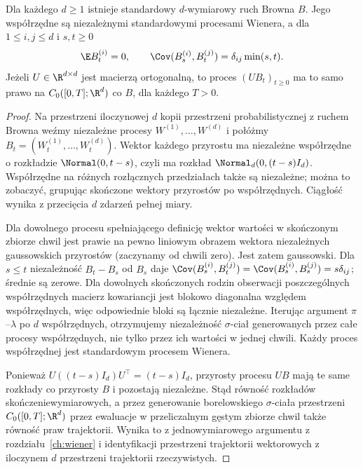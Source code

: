 \begin{twierdzenie}
Dla każdego $d\ge1$ istnieje standardowy $d$-wymiarowy ruch
Browna $B$. Jego współrzędne są niezależnymi standardowymi
procesami Wienera, a dla $1\le i,j\le d$ i $s,t\ge0$
\[
\E B_t^{(i)}=0,\qquad
\Cov(B_s^{(i)},B_t^{(j)})=\delta_{ij}\min(s,t).
\]
Jeżeli $U\in\R^{d\times d}$ jest macierzą ortogonalną,
to proces $(UB_t)_{t\ge0}$ ma to samo prawo na
$C_0([0,T];\R^d)$ co $B$, dla każdego $T>0$.
\end{twierdzenie}
\begin{proof}
Na przestrzeni iloczynowej $d$ kopii przestrzeni probabilistycznej
z ruchem Browna weźmy niezależne procesy $W^{(1)},\ldots,W^{(d)}$
i połóżmy $B_t=(W_t^{(1)},\ldots,W_t^{(d)})$.
Wektor każdego przyrostu ma niezależne współrzędne o rozkładzie
$\Normal(0,t-s)$, czyli ma rozkład $\Normal_d(0,(t-s)I_d)$.
Współrzędne na różnych rozłącznych przedziałach także są niezależne;
można to zobaczyć, grupując skończone wektory przyrostów po
współrzędnych. Ciągłość wynika z przecięcia $d$ zdarzeń pełnej miary.

Dla dowolnego procesu spełniającego definicję wektor
wartości w skończonym zbiorze chwil jest prawie na pewno
liniowym obrazem wektora niezależnych gaussowskich przyrostów
(zaczynamy od chwili zero). Jest zatem gaussowski.
Dla $s\le t$ niezależność $B_t-B_s$ od $B_s$ daje
$\Cov(B_s^{(i)},B_t^{(j)})=\Cov(B_s^{(i)},B_s^{(j)})
=s\delta_{ij}$; średnie są zerowe. Dla dowolnych skończonych
rodzin obserwacji poszczególnych współrzędnych macierz
kowariancji jest blokowo diagonalna względem współrzędnych,
więc odpowiednie bloki są łącznie niezależne. Iterując
argument $\pi$--$\lambda$ po $d$ współrzędnych, otrzymujemy
niezależność $\sigma$-ciał generowanych przez całe procesy
współrzędnych, nie tylko przez ich wartości w jednej chwili.
Każdy proces współrzędnej jest standardowym procesem Wienera.

Ponieważ $U((t-s)I_d)U^\top=(t-s)I_d$, przyrosty procesu $UB$
mają te same rozkłady co przyrosty $B$ i pozostają niezależne.
Stąd równość rozkładów skończeniewymiarowych, a przez generowanie borelowskiego $\sigma$-ciała
przestrzeni $C_0([0,T];\R^d)$ przez ewaluacje w przeliczalnym
gęstym zbiorze chwil także równość praw trajektorii.
Wynika to z jednowymiarowego argumentu z rozdziału~\ref{ch:wiener}
i identyfikacji przestrzeni trajektorii wektorowych z iloczynem
$d$ przestrzeni trajektorii rzeczywistych.
\end{proof}

